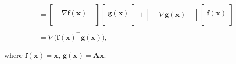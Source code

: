 \documentclass[12pt,thmsa]{article}
\begin{document}
\begin{itemize}
\[\begin{aligned}
		& \\
		& = \left[
			\begin{array}{ccc}  & &\\ &  \nabla \boldsymbol{f}(\boldsymbol{x}) & \\  & & \\  \end{array}
			\right]
		{\left[ \begin{array}{c} \\  \boldsymbol{g}(\boldsymbol{x}) \\ \\ \end{array} \right]} +
			\left[
			\begin{array}{ccc} & \nabla \boldsymbol{g}(\boldsymbol{x}) & \end{array}
			\right]
		{\left[ \begin{array}{c} \\ \boldsymbol{f}(\boldsymbol{x}) \\ \\ \end{array} \right]} \\
		& \\
		& = \nabla \Big(\boldsymbol{f}(\boldsymbol{x})^{\top} \boldsymbol{g}(\boldsymbol{x})\Big),
	\end{aligned} \]
	
	where \(\boldsymbol{f}(\boldsymbol{x})=\boldsymbol{x}\), \(\boldsymbol{g}(\boldsymbol{x})=\mathbf{A}\boldsymbol{x} \).
\end{itemize}
\end{document}
